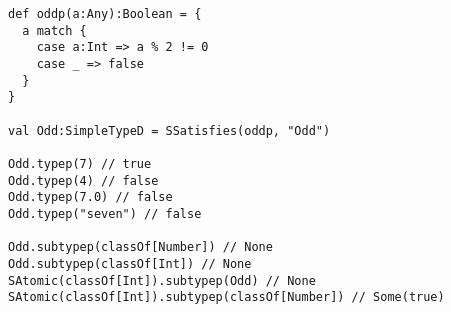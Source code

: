 \begin{lstlisting}[style=reclojureScala]
def oddp(a:Any):Boolean = {
  a match {
    case a:Int => a % 2 != 0
    case _ => false
  }
}

val Odd:SimpleTypeD = SSatisfies(oddp, "Odd")

Odd.typep(7) // true
Odd.typep(4) // false
Odd.typep(7.0) // false
Odd.typep("seven") // false

Odd.subtypep(classOf[Number]) // None
Odd.subtypep(classOf[Int]) // None
SAtomic(classOf[Int]).subtypep(Odd) // None
SAtomic(classOf[Int]).subtypep(classOf[Number]) // Some(true)
\end{lstlisting}
